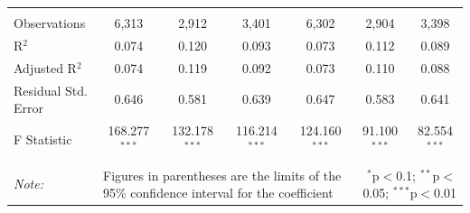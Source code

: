 \documentclass[alpha-refs]{wiley-article-01g}
\begin{document}
\begin{landscape}
\begin{table}[!htbp]
\begin{tabular}{@{\extracolsep{5pt}}lcccccc}
  & & & & & & \\ 
\hline \\[-3ex] 
Observations & 6,313 & 2,912 & 3,401 & 6,302 & 2,904 & 3,398 \\ 
R$^{2}$ & 0.074 & 0.120 & 0.093 & 0.073 & 0.112 & 0.089 \\ 
Adjusted R$^{2}$ & 0.074 & 0.119 & 0.092 & 0.073 & 0.110 & 0.088 \\ 
Residual Std. Error & 0.646 & 0.581 & 0.639 & 0.647 & 0.583 & 0.641 \\ 
F Statistic & 168.277$^{***}$ & 132.178$^{***}$ & 116.214$^{***}$ & 124.160$^{***}$ & 91.100$^{***}$ & 82.554$^{***}$ \\ 
\hline 
\hline \\[-3ex] 
\textit{Note:} &\multicolumn{4}{l}{Figures in parentheses are the limits of the 95\% confidence interval for the coefficient}  & \multicolumn{2}{r}{$^{*}$p$<$0.1; $^{**}$p$<$0.05; $^{***}$p$<$0.01} \\ 
\end{tabular} 
\end{table} 

\end{landscape}

\newpage
\end{document}
